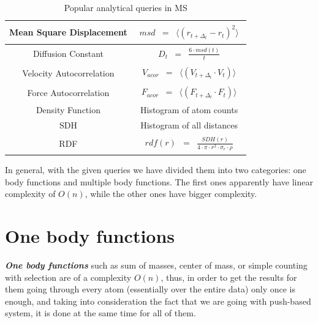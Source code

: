 \documentclass[11pt,a4paper]{report}
\begin{document}
\begin{table}[h]
{\begin{minipage}{\columnwidth}
\begin{tabular}{|c| c|}
\hline
Mean Square Displacement& $\begin{array} {lcl} msd & = & \langle (r_{t+\Delta_t}-r_t)^2 \rangle \end{array}$ \\[0.5ex]
\hline
Diffusion Constant & $\begin{array} {lcl} D_t & = & \frac{6 \cdot msd(t)}{t} \end{array}$ \\[0.5ex]
\hline Velocity Autocorrelation & $\begin{array} {lcl} V_{acor} & =&
\langle (V_{t+\Delta_t}\cdot V_t) \rangle \end{array}$ \\[0.5ex]
\hline
Force Autocorrelation & $\begin{array} {lcl} F_{acor} & = & \langle (F_{t+\Delta_t} \cdot F_t) \rangle \end{array}$ \\[0.5ex]
\hline
Density Function & Histogram of atom counts \\[0.5ex]
\hline
SDH & Histogram of all distances \\[0.5ex]
\hline
RDF & $\begin{array} {lcl} rdf(r) & = & \frac{SDH(r)}{4 \cdot \pi \cdot r^2 \cdot \sigma_r \cdot \rho} \end{array}$ \\[0.5ex]
\hline
\end{tabular}
\caption[Popular analytical queries in MS]{Popular analytical queries in MS }
\label{tb:queries}

\end{minipage}

}
\end{table}

In general, with the given queries we have divided them into two categories: one body functions and multiple body functions. The first ones apparently have linear complexity of $O(n)$, while the other ones have bigger complexity. 

\section{One body functions}
\emph{\textbf{One body functions}} such as sum of masses, center of mass, or simple counting with selection  are of a complexity $O(n)$, thus, in order to get the results for them going through every atom (essentially over the entire data) only once is enough, and taking into consideration the fact that we are going with push-based system, it is done at the same time for all of them. 
\end{document}
